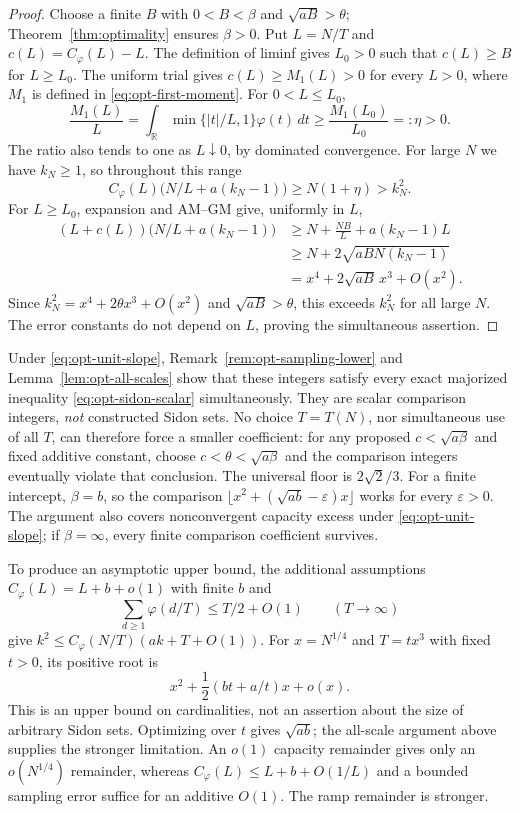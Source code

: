\documentclass[10pt]{article}
\numberwithin{equation}{section}
\theoremstyle{remark}
\begin{document}
\begin{proof}
Choose a finite $B$ with $0<B<\beta$ and $\sqrt{aB}>\theta$;
Theorem~\ref{thm:optimality} ensures $\beta>0$. Put $L=N/T$ and
$c(L)=C_\varphi(L)-L$. The definition of liminf gives $L_0>0$
such that $c(L)\ge B$ for $L\ge L_0$.
The uniform trial gives $c(L)\ge M_1(L)>0$ for every $L>0$, where
$M_1$ is defined in \eqref{eq:opt-first-moment}. For $0<L\le L_0$,
\[
 \frac{M_1(L)}L
 =\int_{\mathbb R}\min\{|t|/L,1\}\varphi(t)\,dt
 \ge\frac{M_1(L_0)}{L_0}=:\eta>0.
\]
The ratio also tends to one as $L\downarrow0$, by dominated convergence.
For large $N$ we have $k_N\ge1$, so throughout this range
\[
 C_\varphi(L)\bigl(N/L+a(k_N-1)\bigr)
 \ge N(1+\eta)>k_N^2.
\]
For $L\ge L_0$, expansion and AM--GM give, uniformly in $L$,
\begin{align*}
 (L+c(L))\bigl(N/L+a(k_N-1)\bigr)
 &\ge N+\frac{NB}L+a(k_N-1)L\\
 &\ge N+2\sqrt{aBN(k_N-1)}\\
 &=x^4+2\sqrt{aB}\,x^3+O(x^2).
\end{align*}
Since $k_N^2=x^4+2\theta x^3+O(x^2)$ and $\sqrt{aB}>\theta$,
this exceeds $k_N^2$ for all large $N$. The error constants do not
depend on $L$, proving the simultaneous assertion.
\end{proof}

Under \eqref{eq:opt-unit-slope}, Remark~\ref{rem:opt-sampling-lower}
and Lemma~\ref{lem:opt-all-scales} show that these integers satisfy
every exact majorized inequality \eqref{eq:opt-sidon-scalar}
simultaneously. They are scalar comparison integers, \emph{not}
constructed Sidon sets. No choice $T=T(N)$, nor simultaneous use of
all $T$, can therefore force a smaller coefficient: for any proposed
$c<\sqrt{a\beta}$ and fixed additive constant, choose
$c<\theta<\sqrt{a\beta}$ and the comparison integers eventually
violate that conclusion. The universal floor is $2\sqrt2/3$.
For a finite intercept, $\beta=b$, so the comparison
$\lfloor x^2+(\sqrt{ab}-\varepsilon)x\rfloor$ works for every
$\varepsilon>0$. The argument also covers nonconvergent capacity
excess under \eqref{eq:opt-unit-slope}; if $\beta=\infty$, every
finite comparison coefficient survives.

To produce an asymptotic upper bound, the additional assumptions
$C_\varphi(L)=L+b+o(1)$ with finite $b$ and
\[
 \sum_{d\ge1}\varphi(d/T)\le T/2+O(1)\qquad(T\to\infty)
\]
give $k^2\le C_\varphi(N/T)(ak+T+O(1))$.
For $x=N^{1/4}$ and $T=tx^3$ with fixed $t>0$, its positive root is
\[
 x^2+\frac12(bt+a/t)x+o(x).
\]
This is an upper bound on cardinalities, not an assertion about the
size of arbitrary Sidon sets. Optimizing over $t$ gives $\sqrt{ab}$;
the all-scale argument above supplies the stronger limitation.
An $o(1)$ capacity remainder gives only an $o(N^{1/4})$ remainder,
whereas $C_\varphi(L)\le L+b+O(1/L)$ and a bounded sampling error
suffice for an additive $O(1)$. The ramp remainder is stronger.
\end{document}
